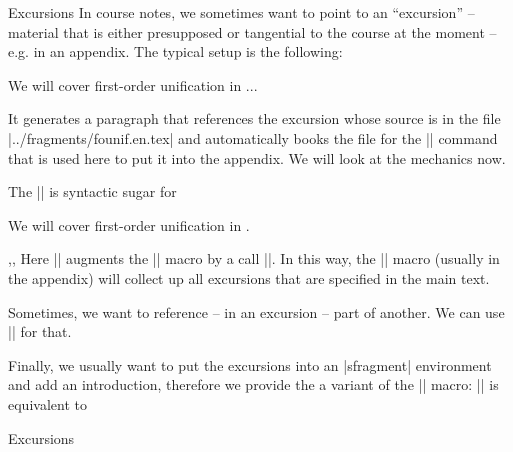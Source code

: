 \begin{sfragment}[id=sec:user:excursions]{Excursions}
In course notes, we sometimes want to point to an ``excursion'' -- material that is either
presupposed or tangential to the course at the moment -- e.g. in an appendix. The typical
setup is the following:

\begin{latexcode}
  {We will cover first-order unification in}
...
\begin{appendix}\printexcursions\end{appendix}
\end{latexcode}

It generates a paragraph that references the excursion whose source is in the file
|../fragments/founif.en.tex| and automatically books the file for the |\printexcursions|
command that is used here to put it into the appendix. We will look at the mechanics now. 

\begin{function}{\excursion}
  The || is syntactic sugar for

\begin{latexcode}
\begin{nparagraph}[title=Excursion]
  We will cover first-order unification in .
\end{nparagraph}
\end{latexcode}
\end{function}

\begin{function}{\activateexcursion,\printexcursion,\excursionref}
  Here || augments the |\printexcursions| macro by a call
  ||. In this way, the |\printexcursions| macro (usually in the
  appendix) will collect up all excursions that are specified in the main text.

  Sometimes, we want to reference -- in an excursion -- part of another. We can use
  || for that.
\end{function}

\begin{function}{\excursiongroup}
  Finally, we usually want to put the excursions into an |sfragment| environment and add
  an introduction, therefore we provide the a variant of the |\printexcursions| macro:
  |\excursiongroup[id=|\meta{id}|,intro=|\meta{path}|]| is equivalent to
\begin{latexcode}
\begin{note}
\begin{sfragment}[id=<id>]{Excursions}
  \printexcursions
\end{sfragment}
\end{note}
\end{latexcode}
\end{function}
\end{sfragment}

